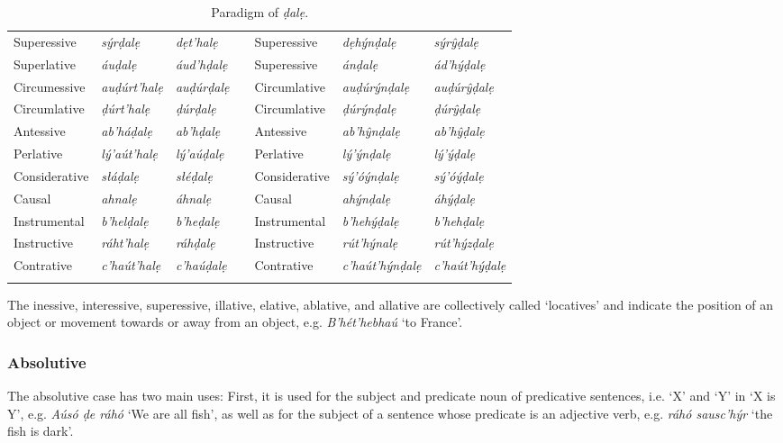 \documentclass[a4paper, 12pt, twoside, final]{article}
\let \w \textit
\begin{document}
\begin{longtable}{l|>{\it}l|>{\it}lll|>{\it}l|>{\it}l}
Superessive   & sýrḍalẹ      & dẹt’halẹ   && Superessive   & dẹhýnḍalẹ       & sýrŷḍalẹ    \\
Superlative   & áuḍalẹ       & áud’hḍalẹ  && Superessive   & ánḍalẹ          & ád’hýḍalẹ   \\
Circumessive  & auḍúrt’halẹ  & auḍúrḍalẹ  && Circumlative  & auḍúrýnḍalẹ     & auḍúrŷḍalẹ  \\
Circumlative  & ḍúrt’halẹ    & ḍúrḍalẹ    && Circumlative  & ḍúrýnḍalẹ       & ḍúrŷḍalẹ    \\
Antessive     & ab’háḍalẹ    & ab’hḍalẹ   && Antessive     & ab’hŷnḍalẹ      & ab’hŷḍalẹ   \\
Perlative     & lý’aút’halẹ  & lý’aúḍalẹ  && Perlative     & lý’ýnḍalẹ       & lý’ýḍalẹ    \\
Considerative & słáḍalẹ      & słéḍalẹ    && Considerative & sý’óýnḍalẹ      & sý’óýḍalẹ   \\
Causal        & ahnalẹ       & áhnalẹ     && Causal        & ahýnḍalẹ        & áhýḍalẹ     \\
Instrumental  & b’helḍalẹ    & b’heḍalẹ   && Instrumental  & b’hehýḍalẹ      & b’hehḍalẹ   \\
Instructive   & ráht’halẹ    & ráhḍalẹ    && Instructive   & rút’hýnalẹ      & rút’hýzḍalẹ \\
Contrative    & c’haút’halẹ  & c’haúḍalẹ  && Contrative    & c’haút’hýnḍalẹ  & c’haút’hýḍalẹ \\
\noalign{\medskip}
\caption{Paradigm of \w{ḍalẹ}.}\label{tab:vocalic-declension}
\end{longtable}



\noindent
The inessive, interessive, superessive, illative, elative, ablative, and allative are collectively called ‘locatives’ and
indicate the position of an object or movement towards or away from an object, e.g. \w{B’hét’hebhaú} ‘to France’.

\subsubsection{Absolutive}
The absolutive case has two main uses: First, it is used for the subject and predicate noun of predicative sentences,
i.e. ‘X’ and ‘Y’ in ‘X is Y’, e.g. \w{Aúsó ḍe ráhó} ‘We are all fish’, as well as for the subject of a sentence whose predicate
is an adjective verb, e.g. \w{ráhó sausc’hýr} ‘the fish is dark’.
\end{document}
